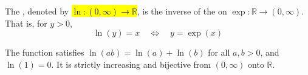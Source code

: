 \begin{definition} \label{definition:natural_logarithm_as_inverse_of_exponential}
The , denoted by \hl{$\ln : (0, \infty) \to \mathbb{R}$}, is the inverse of the  on $\exp: \mathbb{R} \to (0,\infty)$. That is, for $y > 0$,
$$\ln(y) = x \quad \iff \quad y = \exp(x)$$

\TODO{}
The function satisfies $\ln(ab) = \ln(a) + \ln(b)$ for all $a, b > 0$, and $\ln(1) = 0$. It is strictly increasing and bijective from $(0, \infty)$ onto $\mathbb{R}$.
\end{definition}
